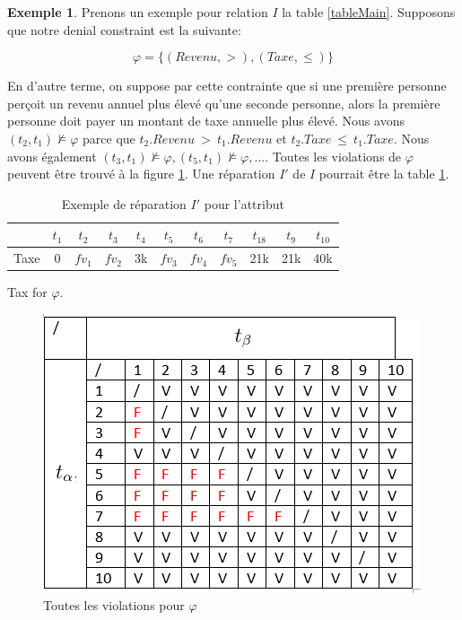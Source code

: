 \documentclass[letterpaper, 12pt]{report}
\theoremstyle{definition}
\newtheorem{myexample}{Exemple}
\begin{document}
\begin{myexample}
Prenons un exemple pour relation $I$ la table \ref{tableMain}. Supposons que notre denial constraint est la suivante:

$$ \varphi = \{(Revenu,>),(Taxe,\leq)\}$$

En d'autre terme, on suppose par cette contrainte que si une première personne perçoit un revenu annuel plus élevé qu'une seconde personne, alors la première personne doit payer un montant de taxe annuelle plus élevé. Nous avons $(t_2,t_1) \not\models \varphi$ parce que $t_2.Revenu\ >\ t_1.Revenu$ et $t_2.Taxe\ \leq\ t_1.Taxe$. Nous avons également $(t_3,t_1) \not\models \varphi,(t_5,t_1) \not\models \varphi,...$. Toutes les violations de $\varphi$ peuvent être trouvé à la figure \ref{BadTax}. Une réparation $I'$ de $I$ pourrait être la table \ref{tableExample}.


\begin{table}[H]
	\centering
	\begin{tabular}{|c|c c c c c c c c c c|}
	\hline
	   & $t_1$ & $t_2$ & $t_3$ &$t_4$ &$t_5$ &$t_6$ &$t_7$ &$t_18$ &$t_9$ &$t_10$ \\
	\hline
	 Taxe & 0 & \color{red} $fv_1$ & \color{red} $fv_2$& 3k & \color{orange}$fv_3$& \color{orange} $fv_4$& \color{orange} $fv_5$& 21k & 21k & 40k\\
	 \hline
	\end{tabular}
	\caption{\label{tableExample} Exemple de réparation $I'$ pour l'attribut} 
	Tax for $\varphi$.
\end{table}


\begin{figure}
	\centering
	\includegraphics[scale=1]{img/TaxBad}
	\caption{\label{BadTax} Toutes les violations pour $\varphi$}
\end{figure}


\end{myexample}
\end{document}
